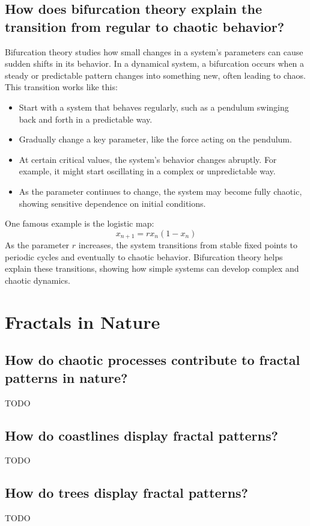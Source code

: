 \documentclass[12pt]{article}
\begin{document}
\subsection{How does bifurcation theory explain the transition from regular to chaotic behavior?}
Bifurcation theory studies how small changes in a system's parameters can cause sudden shifts in its behavior. In a dynamical system, a bifurcation occurs when a steady or predictable pattern changes into something new, often leading to chaos. This transition works like this:
\begin{itemize}
    \item Start with a system that behaves regularly, such as a pendulum swinging back and forth in a predictable way.
    \item Gradually change a key parameter, like the force acting on the pendulum.
    \item At certain critical values, the system's behavior changes abruptly. For example, it might start oscillating in a complex or unpredictable way.
    \item As the parameter continues to change, the system may become fully chaotic, showing sensitive dependence on initial conditions.
\end{itemize}

One famous example is the logistic map:
\[
x_{n+1} = r x_n (1 - x_n)
\]
As the parameter \( r \) increases, the system transitions from stable fixed points to periodic cycles and eventually to chaotic behavior. Bifurcation theory helps explain these transitions, showing how simple systems can develop complex and chaotic dynamics.


\section{Fractals in Nature}
\subsection{How do chaotic processes contribute to fractal patterns in nature?}
TODO

\subsection{How do coastlines display fractal patterns?}
TODO

\subsection{How do trees display fractal patterns?}
TODO
\end{document}
